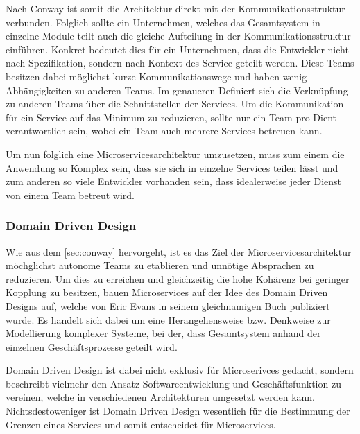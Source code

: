 Nach Conway ist somit die Architektur direkt mit der Kommunikationsstruktur verbunden. Folglich sollte ein Unternehmen, welches das Gesamtsystem in einzelne Module teilt auch die gleiche Aufteilung in der Kommunikationsstruktur einführen. Konkret bedeutet dies für ein Unternehmen, dass die Entwickler nicht nach Spezifikation, sondern nach Kontext des Service geteilt werden. Diese Teams besitzen dabei möglichst kurze Kommunikationswege und haben wenig Abhängigkeiten zu anderen Teams. Im genaueren Definiert sich die Verknüpfung zu anderen Teams über die Schnittstellen der Services.
Um die Kommunikation für ein Service auf das Minimum zu reduzieren, sollte nur ein Team pro Dient verantwortlich sein, wobei ein Team auch mehrere Services betreuen kann. 

Um nun folglich eine Microservicesarchitektur umzusetzen, muss zum einem die Anwendung so Komplex sein, dass sie sich in einzelne Services teilen lässt und zum anderen so viele Entwickler vorhanden sein, dass idealerweise jeder Dienst von einem Team betreut wird.

\subsubsection{Domain Driven Design}
\label{sec:ddd}

Wie aus dem \cref{sec:conway} hervorgeht, ist es das Ziel der Microservicesarchitektur möchglichst autonome Teams zu etablieren und unnötige Absprachen zu reduzieren. Um dies zu erreichen und gleichzeitig die hohe Kohärenz bei geringer Kopplung zu besitzen, bauen Microservices auf der Idee des Domain Driven Designs auf, welche von Eric Evans in seinem gleichnamigen Buch publiziert wurde. Es handelt sich dabei um eine Herangehensweise bzw. Denkweise zur Modellierung komplexer Systeme, bei der, dass Gesamtsystem anhand der einzelnen Geschäftsprozesse geteilt wird.

Domain Driven Design ist dabei nicht exklusiv für Microserivces gedacht, sondern beschreibt vielmehr den Ansatz Softwareentwicklung und Geschäftsfunktion zu vereinen, welche in verschiedenen Architekturen umgesetzt werden kann. Nichtsdestoweniger ist Domain Driven Design wesentlich für die Bestimmung der Grenzen eines Services und somit entscheidet für Microservices.

